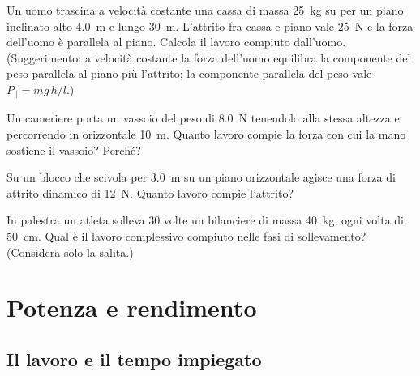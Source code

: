 \begin{esercizio}
Un uomo trascina a velocità costante una cassa di massa \SI{25}{\kilo\gram} su per un piano inclinato alto \SI{4,0}{\metre} e lungo \SI{30}{\metre}. L'attrito fra cassa e piano vale \SI{25}{\newton} e la forza dell'uomo è parallela al piano. Calcola il lavoro compiuto dall'uomo. (Suggerimento: a velocità costante la forza dell'uomo equilibra la componente del peso parallela al piano più l'attrito; la componente parallela del peso vale $P_\parallel = mg\,h/l$.)\\
\end{esercizio}

\begin{esercizio}
Un cameriere porta un vassoio del peso di \SI{8,0}{\newton} tenendolo alla stessa altezza e percorrendo in orizzontale \SI{10}{\metre}. Quanto lavoro compie la forza con cui la mano sostiene il vassoio? Perché?\\
\end{esercizio}

\begin{esercizio}
Su un blocco che scivola per \SI{3,0}{\metre} su un piano orizzontale agisce una forza di attrito dinamico di \SI{12}{\newton}. Quanto lavoro compie l'attrito?\\
\end{esercizio}

\begin{esercizio}
In palestra un atleta solleva \num{30} volte un bilanciere di massa \SI{40}{\kilo\gram}, ogni volta di \SI{50}{\centi\metre}. Qual è il lavoro complessivo compiuto nelle fasi di sollevamento? (Considera solo la salita.)\\
\end{esercizio}

\section{Potenza e rendimento}
\label{sec:potenza-rendimento}

\subsection{Il lavoro e il tempo impiegato}

